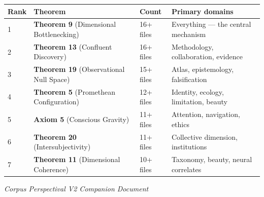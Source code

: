 \begin{longtable}{p{} p{} p{} p{}}
\toprule
\textbf{Rank} & \textbf{Theorem} & \textbf{Count} & \textbf{Primary domains} \\
\midrule
\endhead
1 & \textbf{Theorem 9} (Dimensional Bottlenecking) & 16+ files & Everything — the central mechanism \\
2 & \textbf{Theorem 13} (Confluent Discovery) & 16+ files & Methodology, collaboration, evidence \\
3 & \textbf{Theorem 19} (Observational Null Space) & 15+ files & Atlas, epistemology, falsification \\
4 & \textbf{Theorem 5} (Promethean Configuration) & 12+ files & Identity, ecology, limitation, beauty \\
5 & \textbf{Axiom 5} (Conscious Gravity) & 11+ files & Attention, navigation, ethics \\
6 & \textbf{Theorem 20} (Intersubjectivity) & 11+ files & Collective dimension, institutions \\
7 & \textbf{Theorem 11} (Dimensional Coherence) & 10+ files & Taxonomy, beauty, neural correlates \\
\bottomrule
\end{longtable}



\bigskip\noindent\makebox[\textwidth]{\color{rulegray}\rule{5cm}{0.3pt}}\bigskip


\textit{Corpus Perspectival V2 Companion Document}

